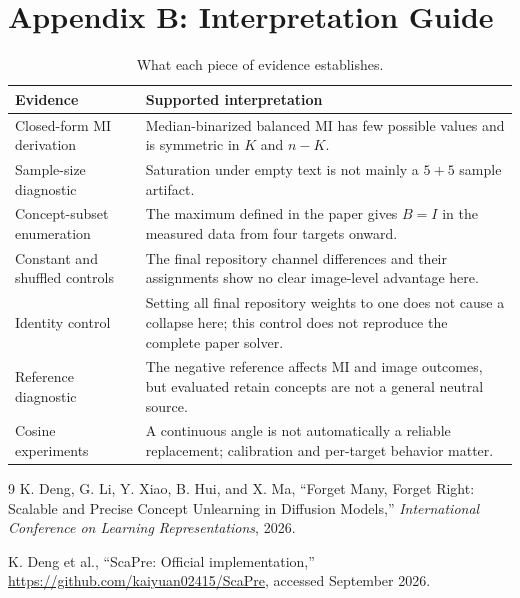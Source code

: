 \documentclass[11pt]{article}
\begin{document}
\section*{Appendix B: Interpretation Guide}
\begin{table}[H]
\centering
\caption{What each piece of evidence establishes.}
\begin{tabular}{>{\raggedright\arraybackslash}p{}p{}}
\toprule
Evidence & Supported interpretation \\
\midrule
Closed-form MI derivation & Median-binarized balanced MI has few possible values and is symmetric in $K$ and $n-K$. \\
Sample-size diagnostic & Saturation under empty text is not mainly a $5+5$ sample artifact. \\
Concept-subset enumeration & The maximum defined in the paper gives $B=I$ in the measured data from four targets onward. \\
Constant and shuffled controls & The final repository channel differences and their assignments show no clear image-level advantage here. \\
Identity control & Setting all final repository weights to one does not cause a collapse here; this control does not reproduce the complete paper solver. \\
Reference diagnostic & The negative reference affects MI and image outcomes, but evaluated retain concepts are not a general neutral source. \\
Cosine experiments & A continuous angle is not automatically a reliable replacement; calibration and per-target behavior matter. \\
\bottomrule
\end{tabular}
\end{table}

\begin{thebibliography}{9}
K. Deng, G. Li, Y. Xiao, B. Hui, and X. Ma,
``Forget Many, Forget Right: Scalable and Precise Concept Unlearning in Diffusion Models,''
\emph{International Conference on Learning Representations}, 2026.

K. Deng et al.,
``ScaPre: Official implementation,''
\url{https://github.com/kaiyuan02415/ScaPre}, accessed September 2026.
\end{thebibliography}
\end{document}
